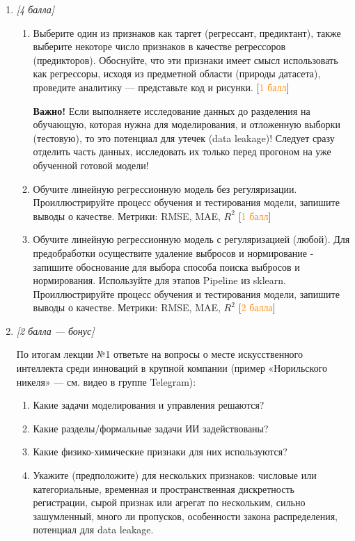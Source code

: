 \begin{enumerate}[label=\textbf{Task \arabic*:}, leftmargin=*]
\item \textit{[4 балла]}

\begin{enumerate}[label=\arabic*.]
    \item Выберите один из признаков как таргет (регрессант, предиктант), также выберите некоторе число признаков в качестве регрессоров (предикторов). Обоснуйте, что эти признаки имеет смысл использовать как регрессоры, исходя из предметной области (природы датасета), проведите аналитику --- представьте код и рисунки. [\textcolor{DarkOrange}{1 балл}]

    \textbf{Важно!} Если выполняете исследование данных до разделения на обучающую, которая нужна для моделирования, и отложенную выборки (тестовую), то это потенциал для утечек (data leakage)! Следует сразу отделить часть данных, исследовать их только перед прогоном на уже обученной готовой модели!

    \item Обучите линейную регрессионную модель без регуляризации. Проиллюстрируйте процесс обучения и тестирования модели, запишите выводы о качестве. Метрики: RMSE, MAE, $R^{2}$ [\textcolor{DarkOrange}{1 балл}]

    \item Обучите линейную регрессионную модель с регуляризацией (любой). Для предобработки осуществите удаление выбросов и нормирование - запишите обоснование для выбора способа поиска выбросов и нормирования. Используйте для этапов Pipeline из sklearn. Проиллюстрируйте процесс обучения и тестирования модели, запишите выводы о качестве. Метрики: RMSE, MAE, $R^{2}$ [\textcolor{DarkOrange}{2 балла}]
\end{enumerate}

\item \textit{[2 балла --- бонус]}

По итогам лекции №1 ответьте на вопросы о месте искусственного интеллекта среди инноваций в крупной компании (пример «Норильского никеля» --- см. видео в группе Telegram):

\begin{enumerate}[label=\arabic*.]
    \item Какие задачи моделирования и управления решаются?
    \item Какие разделы/формальные задачи ИИ задействованы?
    \item Какие физико-химические признаки для них используются?
    \item Укажите (предположите) для нескольких признаков: числовые или категориальные, временная и пространственная дискретность регистрации, сырой признак или агрегат по нескольким, сильно зашумленный, много ли пропусков, особенности закона распределения, потенциал для data leakage.
\end{enumerate}


\end{enumerate}
